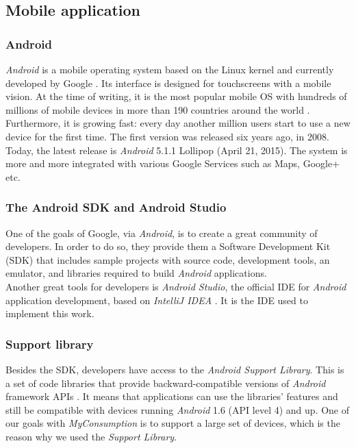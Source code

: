 \documentclass[a4paper, oneside, 11pt]{book}
\begin{document}
\subsection{Mobile application}
\subsubsection{Android}
\textit{Android} is a mobile operating system based on the Linux kernel and currently developed by Google \cite{Android:online}. Its interface is designed for touchscreens with a mobile vision. At the time of writing, it is the most popular mobile OS with hundreds of millions of mobile devices in more than 190 countries around the world \cite{Androidlollipop:online}. Furthermore, it is growing fast: every day another million users start to use a new device for the first time. The first version was released six years ago, in 2008. Today, the latest release is \textit{Android} 5.1.1 Lollipop (April 21, 2015). The system is more and more integrated with various Google Services such as Maps, Google+ etc.

\subsubsection{The Android SDK and Android Studio}
One of the goals of Google, via \textit{Android}, is to create a great community of developers. In order to do so, they provide them a Software Development Kit (SDK) that includes sample projects with source code, development tools, an emulator, and libraries required to build \textit{Android} applications. \\

Another great tools for developers is \textit{Android Studio}, the official IDE for \textit{Android} application development, based on \textit{IntelliJ IDEA} \cite{Androidstudio:online}. It is the IDE used to implement this work.

\subsubsection{Support library}
Besides the SDK, developers have access to the \textit{Android Support Library}. This is a set of code libraries that provide backward-compatible versions of \textit{Android} framework APIs \cite{Support:online}. It means that applications can use the libraries' features and still be compatible with devices running \textit{Android} 1.6 (API level 4) and up. One of our goals with \textit{MyConsumption} is to support a large set of devices, which is the reason why we used the \textit{Support Library}.
\end{document}

